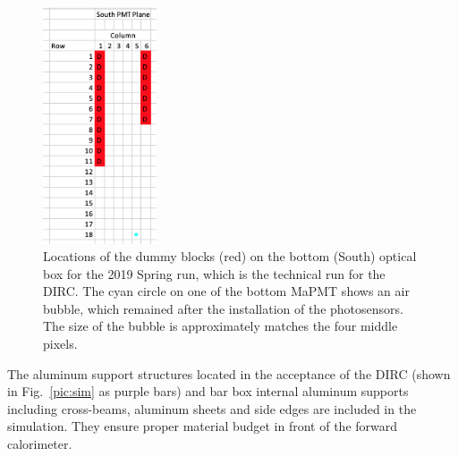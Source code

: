 \begin{figure}[!h]
\centering
\includegraphics[width=0.3\textwidth]{pics/dummies.png}
\caption{\label{pic:dummies}
Locations of the dummy blocks (red) on the bottom (South) optical box for the 2019 Spring run, which is the technical run for the DIRC. The cyan circle on one of the bottom MaPMT shows an air bubble, which remained after the installation of the photosensors. The size of the bubble is approximately matches the four middle pixels.
}
\end{figure}

The aluminum support structures located in the acceptance of the DIRC (shown in Fig.~\ref{pic:sim} as purple bars) and bar box internal aluminum supports including cross-beams, aluminum sheets and side edges are included in the simulation. They ensure proper material budget in front of the forward calorimeter.
